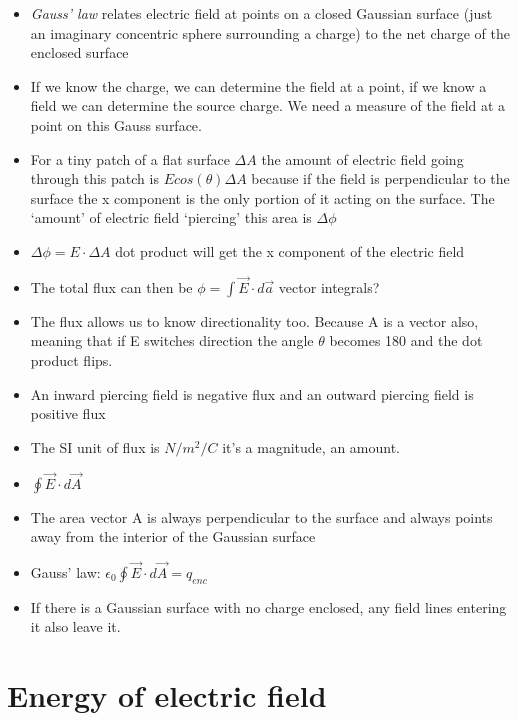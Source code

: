 \documentclass[11pt]{article}
\begin{document}
\begin{itemize}
\tightlist
\item
  \emph{Gauss' law} relates electric field at points on a closed
  Gaussian surface (just an imaginary concentric sphere surrounding a
  charge) to the net charge of the enclosed surface
\item
  If we know the charge, we can determine the field at a point, if we
  know a field we can determine the source charge. We need a measure of
  the field at a point on this Gauss surface.
\item
  For a tiny patch of a flat surface \(\Delta{A}\) the amount of
  electric field going through this patch is \(Ecos(\theta)\Delta{A}\)
  because if the field is perpendicular to the surface the x component
  is the only portion of it acting on the surface. The `amount' of
  electric field `piercing' this area is \(\Delta{\phi}\)
\item
  \(\Delta{\phi} = E\cdot\Delta{A}\) dot product will get the x
  component of the electric field
\item
  The total flux can then be \(\phi = \int{\vec{E} \cdot d\vec{a}}\)
  vector integrals?
\item
  The flux allows us to know directionality too. Because A is a vector
  also, meaning that if E switches direction the angle \(\theta\)
  becomes 180 and the dot product flips.
\item
  An inward piercing field is negative flux and an outward piercing
  field is positive flux
\item
  The SI unit of flux is \(N/m^2/C\) it's a magnitude, an amount.
\item
  \(\oint{\vec{E} \cdot d\vec{A}}\)
\item
  The area vector A is always perpendicular to the surface and always
  points away from the interior of the Gaussian surface
\item
  Gauss' law: \(\epsilon_0 \oint{\vec{E} \cdot d\vec{A}} = q_{enc}\)
\item
  If there is a Gaussian surface with no charge enclosed, any field
  lines entering it also leave it.
\end{itemize}

\hypertarget{energy-of-electric-field}{%
\section{Energy of electric field}\label{energy-of-electric-field}}
\end{document}
